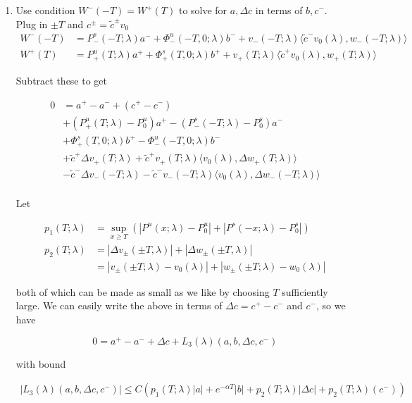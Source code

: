 \documentclass[12pt]{article}
\begin{document}
\begin{enumerate}

\item Use condition $W^-(-T) = W^+(T)$ to solve for $a, \Delta c$ in terms of $b, c^-$.\\

Plug in $\pm T$ and $c^\pm = \tilde{c}^\pm v_0$
\begin{align*}
W^-(-T) &= P^s_-(-T; \lambda)a^- + \Phi^u_-(-T, 0; \lambda)b^- + v_-(-T; \lambda) \langle \tilde{c}^- v_0(\lambda), w_-(-T; \lambda) \rangle \\
W^+(T) &= P^u_+(T; \lambda)a^+ + \Phi^s_+(T, 0; \lambda)b^+ + v_+(T; \lambda) \langle \tilde{c}^+ v_0(\lambda), w_+(T; \lambda) \rangle 
\end{align*}

Subtract these to get

\begin{align*}
0 &= a^+ - a^- + (c^+ - c^-) \\
&+ (P^u_+(T; \lambda) - P_0^u)a^+ - (P^s_-(-T; \lambda) - P_0^s)a^- \\
&+ \Phi^s_+(T, 0; \lambda)b^+ - \Phi^u_-(-T, 0; \lambda)b^- \\
&+ \tilde{c}^+ \Delta v_+(T; \lambda) + \tilde{c}^+ v_+(T; \lambda) \langle v_0(\lambda), \Delta w_+(T; \lambda) \rangle \\
&- \tilde{c}^- \Delta v_-(-T; \lambda) - \tilde{c}^- v_-(-T; \lambda) \langle v_0(\lambda), \Delta w_-(-T; \lambda) \rangle \\
\end{align*}

Let

\begin{align*}
p_1(T;\lambda) &= \sup_{x \geq T} (|P^u(x;\lambda) - P_0^u| + |P^s(-x;\lambda) - P_0^s|) \\
p_2(T; \lambda) &= |\Delta v_\pm(\pm T, \lambda)| + |\Delta w_\pm(\pm T, \lambda)|\\
&= |v_\pm(\pm T; \lambda) - v_0(\lambda)| + |w_\pm(\pm T; \lambda) - w_0(\lambda)|
\end{align*}

both of which can be made as small as we like by choosing $T$ sufficiently large. We can easily write the above in terms of $\Delta c = c^+ - c^-$ and $c^-$, so we have

\[
0 = a^+ - a^- + \Delta c + L_3(\lambda)(a, b, \Delta c, c^-)
\]

with bound

\begin{align*}
|L_3(\lambda)(a, b, \Delta c, c^-)| \leq C( p_1(T; \lambda)|a| + e^{-\alpha T} |b| + p_2(T; \lambda)|\Delta c| + p_2(T; \lambda)(c^-) )
\end{align*}


\end{enumerate}
\end{document}
